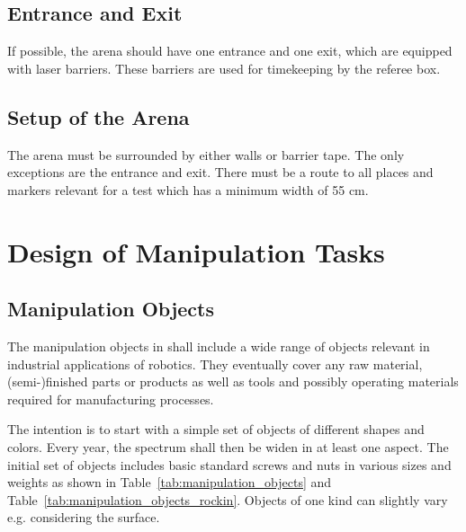 \subsection{Entrance and Exit}
If possible, the arena should have one entrance and one exit, which are equipped with laser barriers. These barriers are used for timekeeping by the referee box.

\subsection{Setup of the Arena}
The arena must be surrounded by either walls or barrier tape. The only exceptions are the entrance and exit. There must be a route to all places and markers relevant for a test which has a minimum width of 55 cm.

\section{Design of Manipulation Tasks}
\label{sec:ManipulationTasks}

\subsection{Manipulation Objects} \label{ssec:ManipulationObjects}
The manipulation objects in \RCAW shall include a wide range of objects relevant in industrial applications of robotics. They eventually cover any raw material, (semi-)finished parts or products as well as tools and possibly operating materials required for manufacturing processes.
\par
The intention is to start with a simple set of objects of different shapes and colors. Every year, the spectrum shall then be widen in at least one aspect. The initial set of objects includes basic standard screws and nuts in various sizes and weights as shown in Table~\ref{tab:manipulation_objects} and Table~\ref{tab:manipulation_objects_rockin}. Objects of one kind can slightly vary e.g. considering the surface. 

